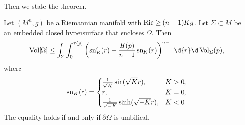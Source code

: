 Then we state the theorem.
\begin{thm}
    Let $(M^n,g)$ be a Riemannian manifold with $\operatorname{Ric}\geq(n-1)Kg$.
    Let $\Sigma\subset M$ be an embedded closed hypersurface that encloses $\Omega$.
    Then
    \[\Vol[\Omega]\leq\int_\Sigma\int_0^{\tau(p)}\left(\sn'_K(r)-\frac{H(p)}{n-1}\sn_K(r)\right)^{n-1}\d{r}\d\Vol_{\Sigma}(p),\]
    where
    \[\operatorname{sn}_K(r)=\begin{cases}
        \frac{1}{\sqrt{K}}\sin(\sqrt{K}r), & K>0,\\
        r, & K=0,\\
        \frac{1}{\sqrt{-K}}\sinh(\sqrt{-K}r), & K<0.
    \end{cases}\]
    The equality holds if and only if $\partial\Omega$ is umbilical.
\end{thm}

